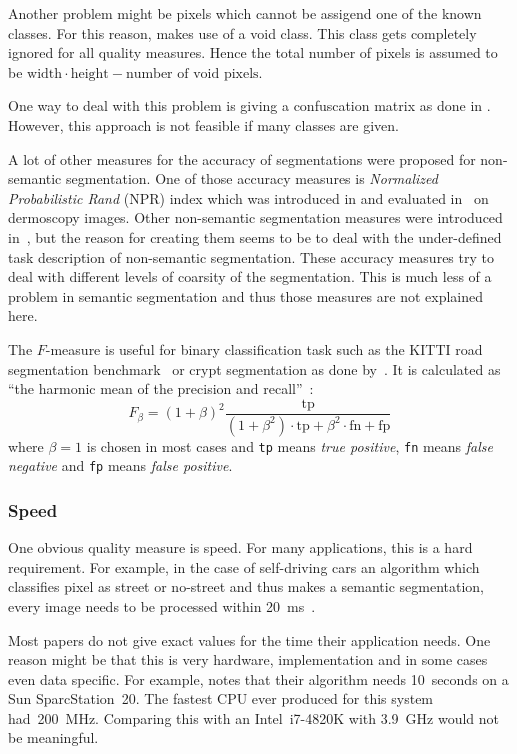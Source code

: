 Another problem might be pixels which cannot be assigend one of the known
classes. For this reason, \cite{shotton2006textonboost} makes use of a void
class. This class gets completely ignored for all quality measures. Hence the
total number of pixels is assumed to be $\text{width} \cdot \text{height} - \text{number of void pixels}$.

One way to deal with this problem is giving a confuscation matrix as done in
\cite{shotton2006textonboost}. However, this approach is not feasible if many
classes are given.


A lot of other measures for the accuracy of segmentations were proposed for
non-semantic segmentation. One of those accuracy measures is \textit{Normalized
Probabilistic Rand} (NPR) index which was introduced in
\cite{unnikrishnan2005measure} and evaluated in~\cite{celebi2009improved}
on dermoscopy images. Other non-semantic segmentation measures were introduced
in~\cite{martin2001database}, but the reason for creating them seems
to be to deal with the under-defined task description of non-semantic
segmentation. These accuracy measures try to deal with different levels of
coarsity of the segmentation. This is much less of a problem in semantic
segmentation and thus those measures are not explained here.

The $F$-measure is useful for binary classification task such as the KITTI road
segmentation benchmark~\cite{Fritsch2013ITSC} or crypt segmentation as done
by~\cite{cohen2015memory}. It is calculated as \enquote{the harmonic mean of
the precision and recall}~\cite{pantofaru2005comparison}:
\[F_\beta = (1+\beta)^2 \frac{\text{tp}}{(1+\beta^2)\cdot \text{tp}+ \beta^2 \cdot \text{fn} + \text{fp}}\]
where $\beta=1$ is chosen in most cases and \texttt{tp} means \textit{true
positive}, \texttt{fn} means \textit{false negative} and  \texttt{fp} means
\textit{false positive}.


\subsubsection{Speed}%
\label{subsubsec:speed-quality-measure}%
One obvious quality measure is speed. For many applications, this is a hard
requirement. For example, in the case of self-driving cars an algorithm which
classifies pixel as street or no-street and thus makes a semantic segmentation,
every image needs to be processed within
\SI{20}{\milli\second}~\cite{bittel2015pixel}.

Most papers do not give exact values for the time their application needs. One
reason might be that this is very hardware, implementation and in some cases
even data specific. For example, \cite{hoover1996experimental} notes that
their algorithm needs 10~seconds on a Sun SparcStation~20. The fastest CPU
ever produced for this system had~\SI{200}{\mega\hertz}. Comparing this with
an Intel~i7-4820K with \SI{3.9}{\giga\hertz} would not be meaningful.


